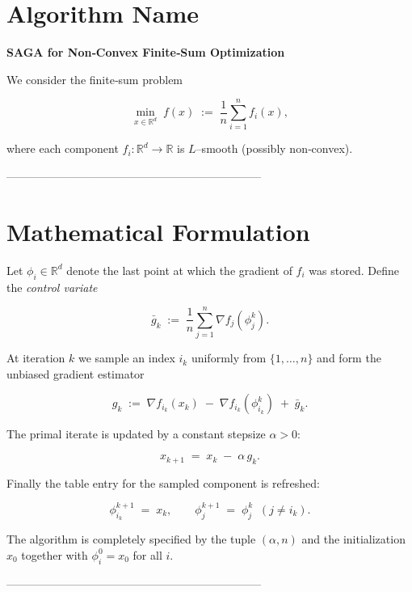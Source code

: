 \documentclass{article}
\newcommand{\R}{\mathbb{R}}
\begin{document}
\section*{Algorithm Name}
\textbf{SAGA for Non‑Convex Finite‑Sum Optimization}  

We consider the finite‑sum problem  

\[
\min_{x\in\R^{d}} \; f(x)\;:=\;\frac{1}{n}\sum_{i=1}^{n} f_i(x),
\]

where each component $f_i:\R^{d}\to\R$ is $L$–smooth (possibly non‑convex).

--------------------------------------------------------------------

\section*{Mathematical Formulation}
Let $\phi_i\in\R^{d}$ denote the last point at which the gradient of $f_i$ was stored.  
Define the \emph{control variate}  

\[
\bar{g}_k \;:=\; \frac{1}{n}\sum_{j=1}^{n}\nabla f_j(\phi_j^k).
\]

At iteration $k$ we sample an index $i_k$ uniformly from $\{1,\dots ,n\}$ and form the unbiased gradient estimator  

\[
g_k \;:=\; \nabla f_{i_k}(x_k)\;-\;\nabla f_{i_k}(\phi_{i_k}^k)\;+\;\bar{g}_k .
\tag{1}
\]

The primal iterate is updated by a constant stepsize $\alpha>0$:

\[
x_{k+1}\;=\;x_k\;-\;\alpha\, g_k .
\tag{2}
\]

Finally the table entry for the sampled component is refreshed:

\[
\phi_{i_k}^{k+1}\;=\;x_k,\qquad
\phi_{j}^{k+1}\;=\;\phi_{j}^{k}\;\;(j\neq i_k).
\tag{3}
\]

The algorithm is completely specified by the tuple $(\alpha,n)$ and the
initialization $x_0$ together with $\phi_i^0=x_0$ for all $i$.

--------------------------------------------------------------------
\end{document}

